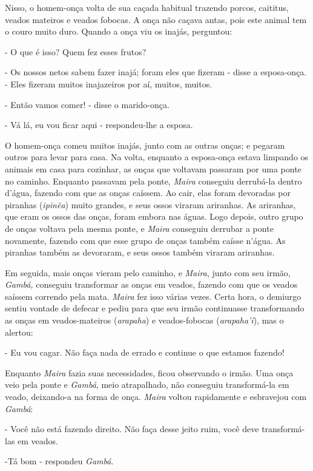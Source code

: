 Nisso, o homem-onça volta de sua caçada habitual trazendo porcos,
caititus, veados mateiros e veados fobocas. A onça não caçava antas,
pois este animal tem o couro muito duro. Quando a onça viu os inajás,
perguntou:

- O que é isso? Quem fez esses frutos?

- Os nossos netos sabem fazer inajá; foram eles que fizeram - disse a
esposa-onça. - Eles fizeram muitos inajazeiros por aí, muitos, muitos.

- Então vamos comer! - disse o marido-onça.

- Vá lá, eu vou ficar aqui - respondeu-lhe a esposa.

O homem-onça comeu muitos inajás, junto com as outras onças; e pegaram
outros para levar para casa. Na volta, enquanto a esposa-onça estava
limpando os animais em casa para cozinhar, as onças que voltavam
passaram por uma ponte no caminho. Enquanto passavam pela ponte,
\emph{Maira} conseguiu derrubá-la dentro d'água, fazendo com que as
onças caíssem. Ao cair, elas foram devoradas por piranhas
(\emph{ipinẽa}) muito grandes, e seus ossos viraram ariranhas. As
ariranhas, que eram os ossos das onças, foram embora nas águas. Logo
depois, outro grupo de onças voltava pela mesma ponte, e \emph{Maira}
conseguiu derrubar a ponte novamente, fazendo com que esse grupo de
onças também caísse n'água. As piranhas também as devoraram, e seus
ossos também viraram ariranhas.

Em seguida, mais onças vieram pelo caminho, e \emph{Maira}, junto com
seu irmão, \emph{Gambá,} conseguiu transformar as onças em veados,
fazendo com que os veados saíssem correndo pela mata. \emph{Maira} fez
isso várias vezes. Certa hora, o demiurgo sentiu vontade de defecar e
pediu para que seu irmão continuasse transformando as onças em
veados-mateiros (\emph{arapaha}) e veados-fobocas (\emph{arapaha'í}),
mas o alertou:

- Eu vou cagar. Não faça nada de errado e continue o que estamos
fazendo!

Enquanto \emph{Maira} fazia suas necessidades, ficou observando o irmão.
Uma onça veio pela ponte e \emph{Gambá}, meio atrapalhado, não conseguiu
transformá-la em veado, deixando-a na forma de onça. \emph{Maira} voltou
rapidamente e esbravejou com \emph{Gambá}:

- Você não está fazendo direito. Não faça desse jeito ruim, você deve
transformá-las em veados.

-Tá bom - respondeu \emph{Gambá}.

